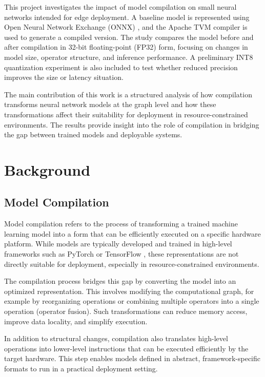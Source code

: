 \documentclass[fleqn,10pt]{olplainarticle}
\begin{document}
This project investigates the impact of model compilation on small neural networks intended for edge deployment. A baseline model is represented using Open Neural Network Exchange (ONNX) \cite{onnx}, and the Apache TVM \cite{chen2018tvm} compiler is used to generate a compiled version. The study compares the model before and after compilation in 32-bit floating-point (FP32) form, focusing on changes in model size, operator structure, and inference performance. A preliminary INT8 quantization experiment is also included to test whether reduced precision improves the size or latency situation.

The main contribution of this work is a structured analysis of how compilation transforms neural network models at the graph level and how these transformations affect their suitability for deployment in resource-constrained environments. The results provide insight into the role of compilation in bridging the gap between trained models and deployable systems.

\section{Background}

\subsection{Model Compilation}

Model compilation refers to the process of transforming a trained machine learning model into a form that can be efficiently executed on a specific hardware platform. While models are typically developed and trained in high-level frameworks such as PyTorch \cite{paszke2019pytorch} or TensorFlow \cite{abadi2016tensorflow}, these representations are not directly suitable for deployment, especially in resource-constrained environments.

The compilation process bridges this gap by converting the model into an optimized representation. This involves modifying the computational graph, for example by reorganizing operations or combining multiple operators into a single operation (operator fusion). Such transformations can reduce memory access, improve data locality, and simplify execution.

In addition to structural changes, compilation also translates high-level operations into lower-level instructions that can be executed efficiently by the target hardware. This step enables models defined in abstract, framework-specific formats to run in a practical deployment setting.
\end{document}
